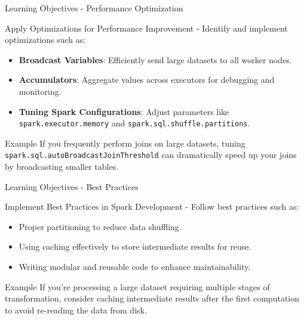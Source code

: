 \documentclass[aspectratio=169]{beamer}
\begin{document}
\begin{frame}[fragile]{Learning Objectives - Performance Optimization}
    \begin{block}{Apply Optimizations for Performance Improvement}
        - Identify and implement optimizations such as:
        \begin{itemize}
            \item \textbf{Broadcast Variables}: Efficiently send large datasets to all worker nodes.
            \item \textbf{Accumulators}: Aggregate values across executors for debugging and monitoring.
            \item \textbf{Tuning Spark Configurations}: Adjust parameters like \texttt{spark.executor.memory} and \texttt{spark.sql.shuffle.partitions}.
        \end{itemize}
    \end{block}

    \begin{block}{Example}
        If you frequently perform joins on large datasets, tuning \texttt{spark.sql.autoBroadcastJoinThreshold} can dramatically speed up your joins by broadcasting smaller tables.
    \end{block}
\end{frame}

\begin{frame}[fragile]{Learning Objectives - Best Practices}
    \begin{block}{Implement Best Practices in Spark Development}
        - Follow best practices such as:
        \begin{itemize}
            \item Proper partitioning to reduce data shuffling.
            \item Using caching effectively to store intermediate results for reuse.
            \item Writing modular and reusable code to enhance maintainability.
        \end{itemize}
    \end{block}

    \begin{block}{Example}
        If you're processing a large dataset requiring multiple stages of transformation, consider caching intermediate results after the first computation to avoid re-reading the data from disk.
    \end{block}
\end{frame}
\end{document}
